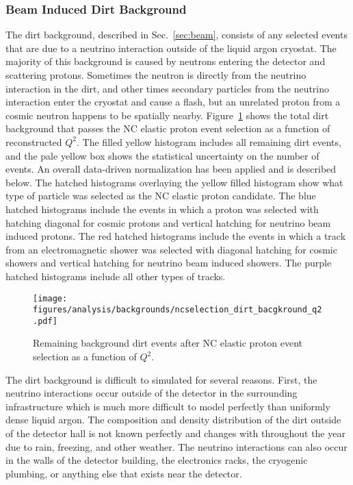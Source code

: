  \subsubsection{Beam Induced Dirt Background}\label{sec:dirt}
    The dirt background, described in Sec.~\ref{sec:beam}, consists of any
    selected events that are due to a neutrino interaction outside of the
    liquid argon cryostat. The majority of this background is caused by
    neutrons entering the detector and scattering protons. Sometimes the
    neutron is directly from the neutrino interaction in the dirt, and other
    times secondary particles from the neutrino interaction enter the cryostat
    and cause a flash, but an unrelated proton from a cosmic neutron happens to
    be spatially nearby. Figure~\ref{fig:selecteddirt} shows the total dirt
    background that passes the NC elastic proton event selection as a function
    of reconstructed $Q^2$. The filled yellow histogram includes all remaining
    dirt events, and the pale yellow box shows the statistical uncertainty on
    the number of events. An overall data-driven normalization has been applied
    and is described below. The hatched histograms overlaying the yellow filled
    histogram show what type of particle was selected as the NC elastic proton
    candidate. The blue hatched histograms include the events in which a proton
    was selected with hatching diagonal for cosmic protons and vertical
    hatching for neutrino beam induced protons. The red hatched histograms
    include the events in which a track from an electromagnetic shower was
    selected with diagonal hatching for cosmic showers and vertical hatching
    for neutrino beam induced showers. The purple hatched histograms include
      all other types of tracks.
    \begin{figure}[ht]
      \centering
      \texttt{[image: figures/analysis/backgrounds/ncselection\_dirt\_bacgkround\_q2.pdf]}
      \caption{Remaining background dirt events after NC elastic proton event
        selection as a function of $Q^2$.}
      \label{fig:selecteddirt}
    \end{figure}

    The dirt background is difficult to simulated for several reasons. First,
    the neutrino interactions occur outside of the detector in the surrounding
    infrastructure which is much more difficult to model perfectly than
    uniformly dense liquid argon. The composition and density distribution of
    the dirt outside of the detector hall is not known perfectly and changes
    with throughout the year due to rain, freezing, and other weather. The
    neutrino interactions can also occur in the walls of the detector building,
    the electronics racks, the cryogenic plumbing, or anything else that exists
    near the detector.
    
